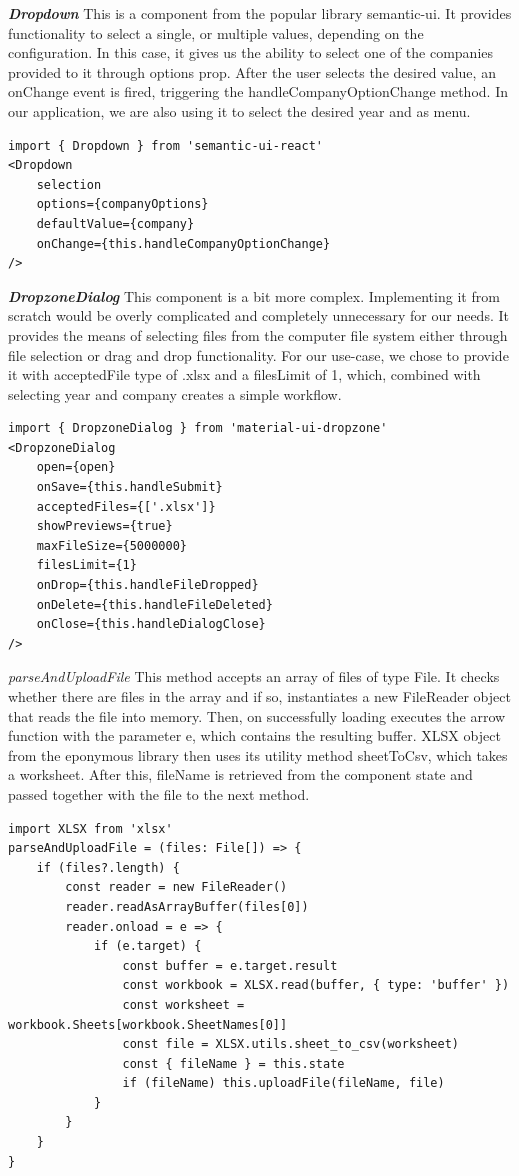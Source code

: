 \documentclass[12pt,oneside]{fithesis2}
\begin{document}
\textit{\textbf{Dropdown}} This is a component from the popular library semantic-ui. It provides functionality to select a single, or multiple values, depending on the configuration. In this case, it gives us the ability to select one of the companies provided to it through options prop. After the user selects the desired value, an onChange event is fired, triggering the handleCompanyOptionChange method. In our application, we are also using it to select the desired year and as menu.

\begin{lstlisting}[style=htmlcssjs]
import { Dropdown } from 'semantic-ui-react'
<Dropdown
    selection
    options={companyOptions}
    defaultValue={company}
    onChange={this.handleCompanyOptionChange}
/>
\end{lstlisting}

\textit{\textbf{DropzoneDialog}} This component is a bit more complex. Implementing it from scratch would be overly complicated and completely unnecessary for our needs. It provides the means of selecting files from the computer file system either through file selection or drag and drop functionality. For our use-case, we chose to provide it with acceptedFile type of .xlsx and a filesLimit of 1, which, combined with selecting year and company creates a simple workflow.

\begin{lstlisting}[style=htmlcssjs]
import { DropzoneDialog } from 'material-ui-dropzone'
<DropzoneDialog
	open={open}
	onSave={this.handleSubmit}
	acceptedFiles={['.xlsx']}
	showPreviews={true}
	maxFileSize={5000000}
	filesLimit={1}
	onDrop={this.handleFileDropped}
	onDelete={this.handleFileDeleted}
	onClose={this.handleDialogClose}
/>
\end{lstlisting}

\textit{\large{parseAndUploadFile}} This method accepts an array of files of type File. It checks whether there are files in the array and if so, instantiates a new FileReader object that reads the file into memory. Then, on successfully loading executes the arrow function with the parameter e, which contains the resulting buffer. XLSX object from the eponymous library then uses its utility method sheetToCsv, which takes a worksheet. After this, fileName is retrieved from the component state and passed together with the file to the next method.

\begin{lstlisting}[style=htmlcssjs]
import XLSX from 'xlsx'
parseAndUploadFile = (files: File[]) => {
	if (files?.length) {
		const reader = new FileReader()
		reader.readAsArrayBuffer(files[0])
		reader.onload = e => {
			if (e.target) {
				const buffer = e.target.result
				const workbook = XLSX.read(buffer, { type: 'buffer' })
				const worksheet = workbook.Sheets[workbook.SheetNames[0]]
				const file = XLSX.utils.sheet_to_csv(worksheet)
				const { fileName } = this.state
				if (fileName) this.uploadFile(fileName, file)
			}
		}
	}
}
\end{lstlisting}
\end{document}
